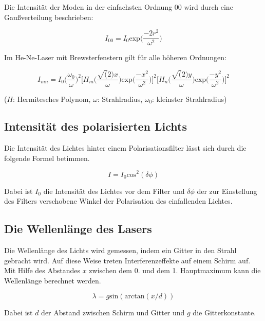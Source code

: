 Die Intensität der Moden in der einfachsten Ordnung 00 wird durch eine Gaußverteilung beschrieben:

\begin{equation}
  I_{00} = I_0 \text{exp} \biggl(\frac{-2r^2}{\omega^2}\biggr)
\end{equation}

Im He-Ne-Laser mit Brewsterfenstern gilt für alle höheren Ordnungen:

\begin{equation}
  I_{mn} = I_0 \biggl(\frac{\omega_0}{\omega}\biggr)^2 \biggl\lbrack H_m \biggl( \frac{\sqrt(2)x}{\omega} \biggr) \text{exp} \biggl( \frac{-x^2}{\omega^2} \biggr) \biggr\rbrack^2 \biggl\lbrack H_n \biggl( \frac{\sqrt(2)y}{\omega} \biggr) \text{exp} \biggl( \frac{-y^2}{\omega^2} \biggr) \biggr\rbrack^2
\end{equation}

($H$: Hermitesches Polynom, $\omega$: Strahlradius, $\omega_0$: kleinster Strahlradius)

\subsection{Intensität des polarisierten Lichts}

Die Intensität des Lichtes hinter einem Polarisationsfilter lässt sich durch die folgende Formel betimmen.

\begin{equation}
  I = I_0 \text{cos}^2(\delta\phi)
\end{equation}

Dabei ist $I_0$ die Intensität des Lichtes vor dem Filter und $\delta\phi$ der zur Einstellung des Filters verschobene Winkel
der Polarisation des einfallenden Lichtes.

\subsection{Die Wellenlänge des Lasers}

Die Wellenlänge des Lichts wird gemessen, indem ein Gitter in den Strahl gebracht wird. Auf diese Weise treten Interferenzeffekte
auf einem Schirm auf. Mit Hilfe des Abstandes $x$ zwischen dem 0. und dem 1. Hauptmaximum kann die Wellenlänge berechnet werden.

\begin{equation}
  \lambda = g \text{sin}(\text{arctan}(x/d))
\end{equation}

Dabei ist $d$ der Abstand zwischen Schirm und Gitter und $g$ die Gitterkonstante.
